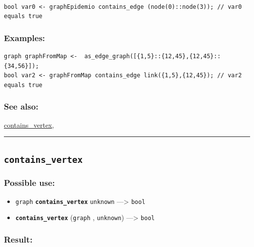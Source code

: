\documentclass[]{book}
\providecommand{\tightlist}{%
  \setlength{\itemsep}{0pt}\setlength{\parskip}{0pt}}
\theoremstyle{definition}
\theoremstyle{definition}
\theoremstyle{definition}
\theoremstyle{remark}
\begin{document}
\begin{verbatim}
 
bool var0 <- graphEpidemio contains_edge (node(0)::node(3)); // var0 equals true
\end{verbatim}

\subsubsection{Examples:}\label{examples-79}

\begin{verbatim}
graph graphFromMap <-  as_edge_graph([{1,5}::{12,45},{12,45}::{34,56}]);  
bool var2 <- graphFromMap contains_edge link({1,5},{12,45}); // var2 equals true
\end{verbatim}

\subsubsection{See also:}\label{see-also-65}

\href{operators-b-to-c.html\#contains_vertex}{contains\_vertex},

\begin{center}\rule{0.5\linewidth}{\linethickness}\end{center}

\subsection{\texorpdfstring{\texttt{contains\_vertex}}{contains\_vertex}}\label{contains_vertex}

\subsubsection{Possible use:}\label{possible-use-103}

\begin{itemize}
\tightlist
\item
  \texttt{graph} \textbf{\texttt{contains\_vertex}} \texttt{unknown}
  ---\textgreater{} \texttt{bool}
\item
  \textbf{\texttt{contains\_vertex}} (\texttt{graph} , \texttt{unknown})
  ---\textgreater{} \texttt{bool}
\end{itemize}

\subsubsection{Result:}\label{result-101}
\end{document}
